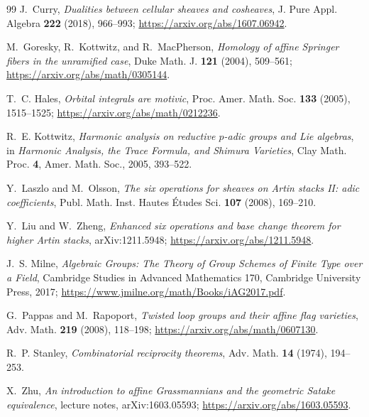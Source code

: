 \documentclass[11pt]{article}
\theoremstyle{definition}
\theoremstyle{remark}
\begin{document}
\begin{thebibliography}{99}
J.~Curry,
\emph{Dualities between cellular sheaves and cosheaves},
J. Pure Appl. Algebra \textbf{222} (2018), 966--993;
\url{https://arxiv.org/abs/1607.06942}.

M.~Goresky, R.~Kottwitz, and R.~MacPherson,
\emph{Homology of affine Springer fibers in the unramified case},
Duke Math. J. \textbf{121} (2004), 509--561;
\url{https://arxiv.org/abs/math/0305144}.

T.~C. Hales,
\emph{Orbital integrals are motivic},
Proc. Amer. Math. Soc. \textbf{133} (2005), 1515--1525;
\url{https://arxiv.org/abs/math/0212236}.

R.~E. Kottwitz,
\emph{Harmonic analysis on reductive $p$-adic groups and Lie algebras},
in \emph{Harmonic Analysis, the Trace Formula, and Shimura Varieties},
Clay Math. Proc. \textbf{4}, Amer. Math. Soc., 2005, 393--522.

Y.~Laszlo and M.~Olsson,
\emph{The six operations for sheaves on Artin stacks II: adic coefficients},
Publ. Math. Inst. Hautes \'Etudes Sci. \textbf{107} (2008), 169--210.

Y.~Liu and W.~Zheng,
\emph{Enhanced six operations and base change theorem for higher Artin
stacks}, arXiv:1211.5948;
\url{https://arxiv.org/abs/1211.5948}.

J.~S. Milne,
\emph{Algebraic Groups: The Theory of Group Schemes of Finite Type over a
Field},
Cambridge Studies in Advanced Mathematics 170,
Cambridge University Press, 2017;
\url{https://www.jmilne.org/math/Books/iAG2017.pdf}.

G.~Pappas and M.~Rapoport,
\emph{Twisted loop groups and their affine flag varieties},
Adv. Math. \textbf{219} (2008), 118--198;
\url{https://arxiv.org/abs/math/0607130}.

R.~P. Stanley,
\emph{Combinatorial reciprocity theorems},
Adv. Math. \textbf{14} (1974), 194--253.

X.~Zhu,
\emph{An introduction to affine Grassmannians and the geometric Satake
equivalence},
lecture notes, arXiv:1603.05593;
\url{https://arxiv.org/abs/1603.05593}.

\end{thebibliography}
\end{document}
